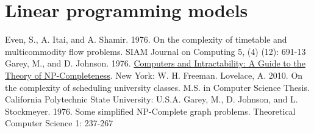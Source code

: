 \documentclass[]{article}
\theoremstyle{definition}
\theoremstyle{remark}
\numberwithin{equation}{section}
\begin{document}
\section{Linear programming models}

\begin{thebibliography}{9}
  Even, S., A. Itai, and A. Shamir. 1976. On the complexity of timetable and multicommodity flow problems. SIAM Journal on Computing 5, (4) (12): 691-13
  Garey, M., and D. Johnson. 1976. \underline{Computers and Intractability: A Guide to the Theory of NP-Completeness}. New York: W. H. Freeman.
  Lovelace, A. 2010. On the complexity of scheduling university classes. M.S. in Computer Science Thesis. California Polytechnic State University: U.S.A.	
  Garey, M., D. Johnson, and L. Stockmeyer. 1976. Some simplified NP-Complete graph problems. Theoretical Computer Science 1: 237-267
\end{thebibliography}
\end{document}
